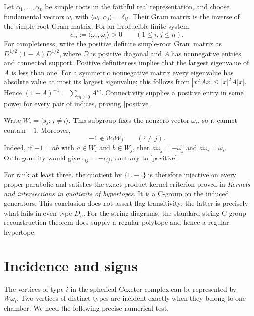 \documentclass[11pt,a4paper]{article}
\newcommand{\gen}[1]{\langle #1\rangle}
\begin{document}
Let $\alpha_1,\ldots,\alpha_n$ be simple roots in the faithful real
representation, and choose fundamental vectors $\omega_i$ with
$\langle\omega_i,\alpha_j\rangle=\delta_{ij}$. Their Gram matrix is the
inverse of the simple-root Gram matrix. For an irreducible finite system,
\begin{equation}\label{positive}
 c_{ij}:=\langle\omega_i,\omega_j\rangle>0\qquad(1\leq i,j\leq n).
\end{equation}
For completeness, write the positive definite simple-root Gram matrix as
$D^{1/2}(1-A)D^{1/2}$, where $D$ is positive diagonal and $A$ has nonnegative
entries and connected support. Positive definiteness implies that the
largest eigenvalue of $A$ is less than one. For a symmetric nonnegative
matrix every eigenvalue has absolute value at most its largest eigenvalue;
this follows from $|x^TAx|\leq |x|^TA|x|$. Hence
$(1-A)^{-1}=\sum_{m\geq0}A^m$. Connectivity supplies a positive entry in
some power for every pair of indices, proving \eqref{positive}.

Write $W_i=\gen{s_j:j\ne i}$. This subgroup fixes the nonzero vector
$\omega_i$, so it cannot contain $-1$. Moreover,
\begin{equation}\label{products}
 -1\notin W_iW_j\qquad(i\ne j).
\end{equation}
Indeed, if $-1=ab$ with $a\in W_i$ and $b\in W_j$, then
$a\omega_j=-\omega_j$ and $a\omega_i=\omega_i$. Orthogonality would give
$c_{ij}=-c_{ij}$, contrary to \eqref{positive}.

For rank at least three, the quotient by $\{1,-1\}$ is therefore injective
on every proper parabolic and satisfies the exact product-kernel criterion
proved in \emph{Kernels and intersections in quotients of hypertopes}.
It is a C-group on the induced generators. This conclusion does not assert
flag transitivity: the latter is precisely what fails in even type $D_n$.
For the string diagrams, the standard string C-group reconstruction theorem
does supply a regular polytope and hence a regular hypertope.

\section{Incidence and signs}

The vertices of type $i$ in the spherical Coxeter complex can be represented
by $W\omega_i$. Two vertices of distinct types are incident exactly when
they belong to one chamber. We need the following precise numerical test.
\end{document}
